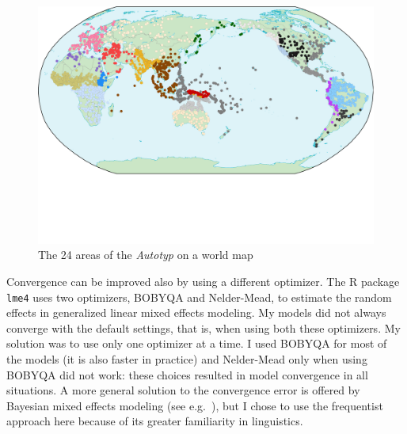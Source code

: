 \documentclass[output=collectionpaper]{langsci/langscibook}
\begin{document}
\begin{figure}
\includegraphics[width=\textwidth]{figures/13/Fig8_Map24areas_s}
\caption{The 24 areas of the \textit{Autotyp} on a world map}
\label{fig:Sinne:8}
\end{figure}

Convergence can be improved also by using a different optimizer. The R package \texttt{lme4} \citep{Bates2015} uses two optimizers, BOBYQA and Nelder-Mead, to estimate the random effects in generalized linear mixed effects modeling. My models did not always converge with the default settings, that is, when using both these optimizers. My solution was to use only one optimizer at a time. I used BOBYQA for most of the models (it is also faster in practice) and Nelder-Mead only when using BOBYQA did not work: these choices resulted in model convergence in all situations. A more general solution to the convergence error is offered by Bayesian mixed effects modeling (see e.g.\ \citealt{Kimballsubmitted}), but I chose to use the frequentist approach here because of its greater familiarity in linguistics.
\end{document}
